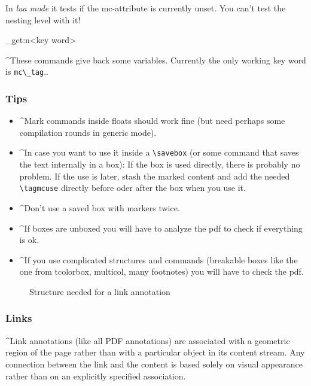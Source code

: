 \documentclass[DIV=12,parskip=half-,bibliography=totoc]{scrartcl}
\begin{document}
\TagP In \emph{lua mode} it tests if the mc-attribute is currently unset. You can't test the nesting level with it!\TagPend

\ExplSyntaxOn
\DescribeMacro{}
\DescribeMacro\uftag_get:n{<key word>}
\ExplSyntaxOff

\TagP^These commands give back some variables. Currently the only working key word is \verb+mc\_tag+.\TagPend.

\subsubsection{Tips}

\begin{itemize}
\item \TagP^Mark commands inside floats should work fine (but need perhaps some compilation rounds in generic mode).\Pmeti
\item \TagP^In case you want to use it inside a \verb+\savebox+ (or some command that saves the text internally in a box): If the box is used directly, there is probably no problem. If the use is later, stash the marked content and add the needed \verb+\tagmcuse+ directly  before oder after the box when you use it.\Pmeti
\item \TagP^Don't use a saved box with markers twice.\Pmeti
\item \TagP^If boxes are unboxed you will have to analyze the pdf to check if everything is ok.\Pmeti
\item \TagP^If you use complicated structures and commands (breakable boxes like the one from tcolorbox, multicol, many footnotes) you will have to check the pdf.\Pmeti
 \end{itemize}


\begin{figure}

\tagmcend\tagstructend
{}
\caption{Structure needed for a link annotation}\label{fig:linkannot}
\tagmcend\tagstructend
\end{figure}

\subsubsection{Links}

\TagP^Link annotations (like all PDF annotations) are associated with a geometric region of the page rather than with a particular object in its content stream. Any connection between the link and the content is based solely on visual appearance rather than on an explicitly specified association.\TagPend
\end{document}

